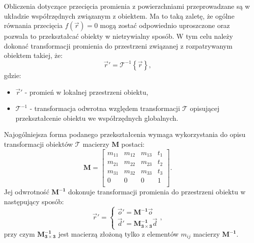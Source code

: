 \begin{enumerate}


Obliczenia dotyczące przecięcia promienia z powierzchniami przeprowadzane są w układzie współrzędnych związanym z obiektem. Ma to taką zaletę, że ogólne równania przecięcia $f(\vec{r})=0$ mogą zostać odpowiednio uproszczone oraz pozwala to przekształcać obiekty w nietrywialny sposób. W tym celu należy dokonać transformacji promienia do przestrzeni związanej z rozpatrywanym obiektem takiej, że:
\begin{equation}
\vec{r}' = \mathcal{T}^{-1}\left\lbrace\vec{r}\right\rbrace,
\end{equation}
gdzie:
\begin{itemize}
\item[] $\vec{r}'$ - promień w lokalnej przestrzeni obiektu,
\item[] $\mathcal{T}^{-1}$ - transformacja odwrotna względem transformacji $\mathcal{T}$ opisującej przekształcenie obiektu we współrzędnych globalnych.
\end{itemize}
Najogólniejsza forma podanego przekształcenia wymaga wykorzystania do opisu transformacji obiektów $\mathcal{T}$  macierzy $\mathbf{M}$ postaci:
\begin{equation}
\mathbf{M} = 
\begin{bmatrix}
    m_{11} & m_{12} & m_{13}  & t_{1} \\
    m_{21} & m_{22} & m_{23}   & t_{2} \\
    m_{31} & m_{32} & m_{33}   & t_{3} \\
    0 & 0 & 0 & 1 \\
\end{bmatrix}.
\end{equation}
Jej odwrotność $\mathbf{M^{-1}}$ dokonuje transformacji promienia do przestrzeni obiektu w następujący sposób:
\begin{equation}
\vec{r}' = 
\begin{cases}
\vec{o}' = \mathbf{M^{-1}}\vec{o}\\
\vec{d}' = \mathbf{M_{3\times 3}^{-1}}\vec{d}
\end{cases},
\end{equation}
przy czym $\mathbf{M_{3\times 3}^{-1}}$ jest macierzą złożoną tylko z elementów $m_{ij}$ macierzy $\mathbf{M^{-1}}$.


\end{enumerate}
